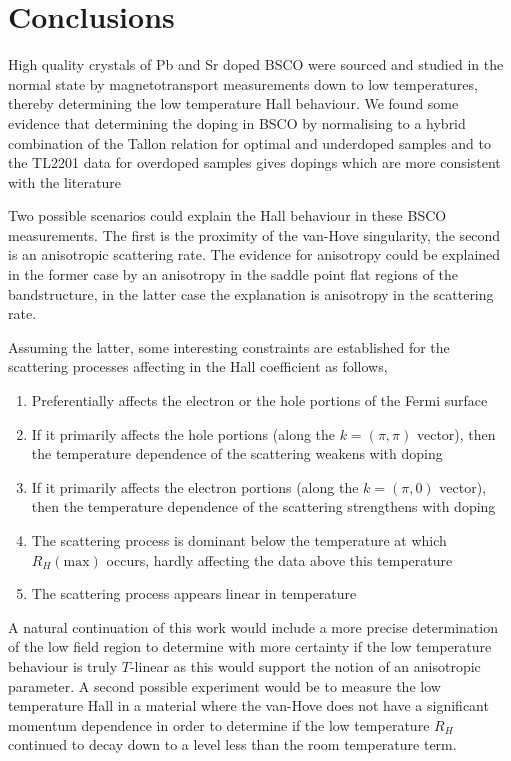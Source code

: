 
\section{Conclusions}

High quality crystals of Pb and Sr doped \ac{BSCO} were sourced and studied in the normal state by magnetotransport measurements down to low temperatures, thereby determining the low temperature Hall behaviour. We found some evidence that determining the doping in \ac{BSCO} by normalising to a hybrid combination of the Tallon relation for optimal and underdoped samples and to the \ac{TL2201} data for overdoped samples gives dopings which are more consistent with the literature 

Two possible scenarios could explain the Hall behaviour in these \ac{BSCO} measurements. The first is the proximity of the van-Hove singularity, the second is an anisotropic scattering rate. The evidence for anisotropy could be explained in the former case by an anisotropy in the saddle point flat regions of the bandstructure, in the latter case the explanation is anisotropy in the scattering rate.

Assuming the latter, some interesting constraints are established for the scattering processes affecting in the Hall coefficient as follows,

\begin{enumerate}
    \item Preferentially affects the electron or the hole portions of the Fermi surface
    \item If it primarily affects the hole portions (along the $k=(\pi, \pi)$ vector), then the temperature dependence of the scattering weakens with doping
    \item If it primarily affects the electron portions (along the $k=(\pi, 0)$ vector), then the temperature dependence of the scattering strengthens with doping
    \item The scattering process is dominant below the temperature at which $R_H(\textrm{max})$ occurs, hardly affecting the data above this temperature
    \item The scattering process appears linear in temperature
\end{enumerate}

A natural continuation of this work would include a more precise determination of the low field region to determine with more certainty if the low temperature behaviour is truly $T$-linear as this would support the notion of an anisotropic parameter. A second possible experiment would be to measure the low temperature Hall in a material where the van-Hove does not have a significant momentum dependence in order to determine if the low temperature $R_H$ continued to decay down to a level less than the room temperature term.
